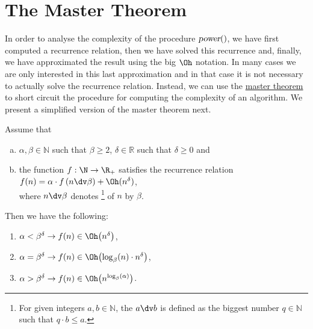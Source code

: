 \section{The Master Theorem}
In order to analyse the complexity of  the procedure $\textsl{power}()$,
we have first computed a  recurrence relation, then we have solved this recurrence and, finally,  
we have approximated the result using the big $\Oh$ notation.  In many cases we are only interested in this
last approximation and in that case it is not necessary to actually solve the recurrence relation.  
Instead, we can use the 
\href{http://en.wikipedia.org/wiki/Master_theorem#Generic_form}{master theorem} to short 
circuit the procedure for computing the complexity of an algorithm. 
We present a simplified version of the master theorem next.

\begin{Theorem} 
  Assume that 
  \begin{enumerate}[(a)]
  \item $\alpha,\beta \in \mathbb{N}$ such that  $\beta \geq 2$, $\delta \in \mathbb{R}$ such that $\delta \geq
    0$ and
  \item the function $f:\N \rightarrow \R_+$ satisfies the recurrence relation
        \\[0.2cm]
        \hspace*{1.3cm}
        $f(n) = \alpha \cdot f\left(n \dv \beta\right) + \Oh(n^\delta)$,
        \\[0.2cm]
        where $n \dv \beta$ denotes \footnote{
          For given integers $a, b \in \mathbb{N}$, the  $a \dv b$
          is defined as the biggest number $q \in \mathbb{N}$ such that $q \cdot b \leq a$.  
        }  
        of $n$ by $\beta$.
  \end{enumerate}
  Then we have the following:
  \begin{enumerate}
  \item $\alpha < \beta^\delta\rightarrow f(n) \in \Oh\bigl(n^{\delta}\bigr)$,
  \item $\alpha = \beta^\delta\rightarrow f(n) \in \Oh\bigl(\log_\beta(n) \cdot n^{\delta}\bigr)$,
  \item $\alpha > \beta^{\delta} \rightarrow f(n) \in \Oh\bigl(n^{\log_{\beta}(\alpha)}\bigr)$. 
  \end{enumerate}
\end{Theorem}

